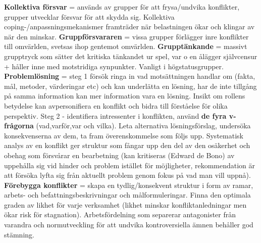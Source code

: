 \documentclass{report}
\begin{document}
\textbf{Kollektiva försvar} = används av grupper för att frysa/undvika konflikter, grupper utvecklar försvar för att skydda sig. Kollektiva coping-/anpassningsmekanismer framträder när belastningen ökar och klingar av när den minskar. \textbf{Gruppförsvararen} = vissa grupper förlägger inre konflikter till omvärlden, svetsas ihop gentemot omvärlden. \textbf{Grupptänkande} = massivt grupptryck som sätter det kritiska tänkandet ur spel, var o en ålägger självcensur + håller inne med motstridiga synpunkter. Vanligt i högstatusgrupper. \textbf{Problemlösning} = steg 1 försök ringa in vad motsättningen handlar om (fakta, mål, metoder, värderingar etc) och kan underlätta en lösning, har de inte tillgång på samma information kan mer information vara en lösning. Insikt om rollens betydelse kan avpersonifiera en konflikt och bidra till förståelse för olika perspektiv. Steg 2 - identifiera intressenter i konflikten, använd \textbf{de fyra v-frågorna} (vad,varför,var och vilka). Leta alternativa lösningsförslag, undersöka konsekvenserna av dem, ta fram överenskommelse som följs upp. Systematisk analys av en konflikt ger struktur som fångar upp den del av den osäkerhet och obehag som försvårar en bearbetning (kan kritiseras (Edward de Bono) av uppehålla sig vid hinder och problem istället för möjligheter, rekommendation är att försöka lyfta sig från aktuellt problem genom fokus på vad man vill uppnå). \textbf{Förebygga konflikter} = skapa en tydlig/konsekvent struktur i form av ramar, arbets- och befattningsbeskrivningar och målformuleringar. Finna den optimala graden av likhet för varje verksamhet (likhet minskar konfliktanledningar men ökar risk för stagnation). Arbetsfördelning som separerar antagonister från varandra och normutveckling för att undvika kontroversiella ämnen behåller god stämning.
\end{document}
